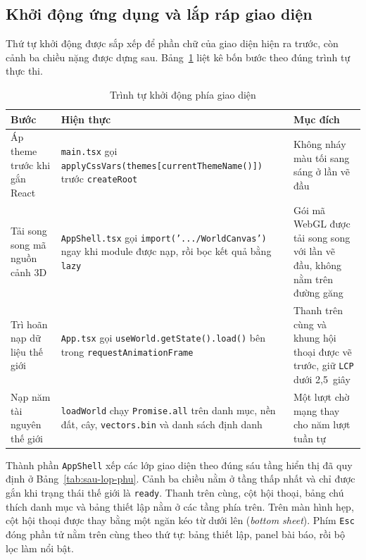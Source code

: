\subsection{Khởi động ứng dụng và lắp ráp giao diện}
\label{subsec:fe-khoi-dong}

Thứ tự khởi động được sắp xếp để phần chữ của giao diện hiện ra trước, còn cảnh ba chiều nặng được dựng sau. Bảng~\ref{tab:fe-khoi-dong} liệt kê bốn bước theo đúng trình tự thực thi.

\begin{table}[htbp]
\centering
\caption{Trình tự khởi động phía giao diện}
\label{tab:fe-khoi-dong}
\footnotesize
\setlength{\tabcolsep}{4pt}
\begin{tabularx}{\textwidth}{
  >{\raggedright\arraybackslash}p{3.0cm}
  >{\raggedright\arraybackslash}p{5.0cm}
  >{\raggedright\arraybackslash}X
}
\toprule
\textbf{Bước} & \textbf{Hiện thực} & \textbf{Mục đích} \\
\midrule
Áp theme trước khi gắn React & \texttt{main.tsx} gọi \texttt{applyCssVars(\allowbreak{}themes[\allowbreak{}currentThemeName()])} trước \texttt{createRoot} & Không nháy màu tối sang sáng ở lần vẽ đầu \\
\midrule
Tải song song mã nguồn cảnh 3D & \texttt{AppShell.tsx} gọi \texttt{import('.../WorldCanvas')} ngay khi module được nạp, rồi bọc kết quả bằng \texttt{lazy} & Gói mã WebGL được tải song song với lần vẽ đầu, không nằm trên đường găng \\
\midrule
Trì hoãn nạp dữ liệu thế giới & \texttt{App.tsx} gọi \texttt{useWorld.getState().load()} bên trong \texttt{requestAnimationFrame} & Thanh trên cùng và khung hội thoại được vẽ trước, giữ \texttt{LCP} dưới 2,5~giây \\
\midrule
Nạp năm tài nguyên thế giới & \texttt{loadWorld} chạy \texttt{Promise.all} trên danh mục, nền đất, cây, \texttt{vectors.bin} và danh sách định danh & Một lượt chờ mạng thay cho năm lượt tuần tự \\
\bottomrule
\end{tabularx}
\end{table}

Thành phần \texttt{AppShell} xếp các lớp giao diện theo đúng sáu tầng hiển thị đã quy định ở Bảng~\ref{tab:sau-lop-phu}. Cảnh ba chiều nằm ở tầng thấp nhất và chỉ được gắn khi trạng thái thế giới là \texttt{ready}. Thanh trên cùng, cột hội thoại, bảng chú thích danh mục và bảng thiết lập nằm ở các tầng phía trên. Trên màn hình hẹp, cột hội thoại được thay bằng một ngăn kéo từ dưới lên (\textit{bottom sheet}). Phím \texttt{Esc} đóng phần tử nằm trên cùng theo thứ tự: bảng thiết lập, panel bài báo, rồi bộ lọc làm nổi bật.

